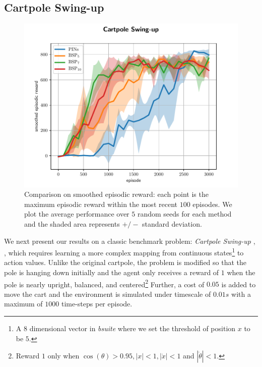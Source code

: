 \documentclass[letterpaper]{article} %
\newcommand{\abs}[1]{\left|#1\right|}
\theoremstyle{definition}
\begin{document}
\subsection{Cartpole Swing-up}
\begin{figure}[ht]
\centering
\includegraphics[width=1.0\linewidth]{cartpole_std_plot.pdf}
\caption{Comparison on smoothed episodic reward: each point is the maximum episodic reward within the most recent $100$ episodes. We plot the average performance over $5$ random seeds for each method and the shaded area represents $+/-$ standard deviation.}
\label{fig:cartpole_per}
\end{figure}

We next present our results on a classic benchmark problem: \textit{Cartpole Swing-up} \cite{sutton2018reinforcement}, \cite{osband2019bsuite}, which requires learning a more complex mapping from continuous states\footnote{A $8$ dimensional vector in \textit{bsuite} where we set the threshold of position $x$ to be $5$.} to action values. Unlike the original cartpole, the problem is modified so that the pole is hanging down initially and the agent only receives a reward of $1$ when the pole is nearly upright, balanced, and centered\footnote{Reward $1$ only when $\cos(\theta) > 0.95, \abs{x} < 1, \abs{\Dot{x}} < 1$ and $|\Dot{\theta}| < 1$.} Further, a cost of $0.05$ is added to move the cart and the environment is simulated under timescale of $0.01s$ with a maximum of $1000$ time-steps per episode.
\end{document}
